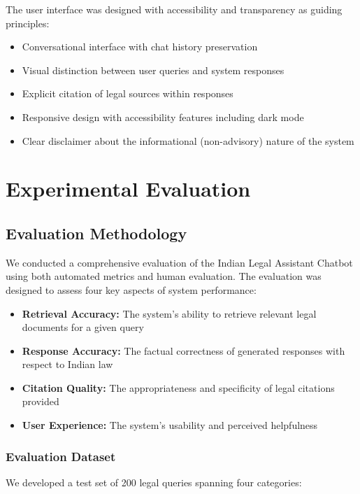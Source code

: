 \documentclass[conference]{IEEEtran}
\begin{document}
The user interface was designed with accessibility and transparency as guiding principles:

\begin{itemize}
    \item Conversational interface with chat history preservation
    \item Visual distinction between user queries and system responses
    \item Explicit citation of legal sources within responses
    \item Responsive design with accessibility features including dark mode
    \item Clear disclaimer about the informational (non-advisory) nature of the system
\end{itemize}

\section{Experimental Evaluation}

\subsection{Evaluation Methodology}

We conducted a comprehensive evaluation of the Indian Legal Assistant Chatbot using both automated metrics and human evaluation. The evaluation was designed to assess four key aspects of system performance:

\begin{itemize}
    \item \textbf{Retrieval Accuracy:} The system's ability to retrieve relevant legal documents for a given query
    \item \textbf{Response Accuracy:} The factual correctness of generated responses with respect to Indian law
    \item \textbf{Citation Quality:} The appropriateness and specificity of legal citations provided
    \item \textbf{User Experience:} The system's usability and perceived helpfulness
\end{itemize}

\subsubsection{Evaluation Dataset}

We developed a test set of 200 legal queries spanning four categories:
\end{document}
